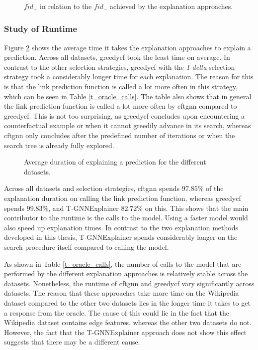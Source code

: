 \begin{figure}[ht]
    \centering
    
    \caption{$fid_+$ in relation to the $fid_-$ achieved by the explanation approaches.}
    \label{f_fid_plus_minus}
\end{figure}


\FloatBarrier
\subsubsection{Study of Runtime}
\label{s_Evaluation_Results_Runtime}

Figure \ref{f_duration} shows the average time it takes the explanation approaches to explain a prediction. Across all datasets, \gls{greedycf} took the least time on average. In contrast to the other selection strategies, \gls{greedycf} with the \textit{1-delta} selection strategy took a considerably longer time for each explanation. The reason for this is that the link prediction function is called a lot more often in this strategy, which can be seen in Table \ref{t_oracle_calls}. The table also shows that in general the link prediction function is called a lot more often by \gls{cftgnn} compared to \gls{greedycf}. This is not too surprising, as \gls{greedycf} concludes upon encountering a counterfactual example or when it cannot greedily advance in its search, whereas \gls{cftgnn} only concludes after the predefined number of iterations or when the search tree is already fully explored.

\begin{figure}
    \centering
    
    \caption{Average duration of explaining a prediction for the different datasets.}
    \label{f_duration}
\end{figure}


Across all datasets and selection strategies, \gls{cftgnn} spends $97.85\%$ of the explanation duration on calling the link prediction function, whereas \gls{greedycf} spends $99.83\%$, and T-GNNExplainer $82.72\%$ on this. This shows that the main contributor to the runtime is the calls to the model. Using a faster model would also speed up explanation times. In contrast to the two explanation methods developed in this thesis, T-GNNExplainer spends considerably longer on the search procedure itself compared to calling the model.

As shown in Table \ref{t_oracle_calls}, the number of calls to the model that are performed by the different explanation approaches is relatively stable across the datasets. Nonetheless, the runtime of \gls{cftgnn} and \gls{greedycf} vary significantly across datasets. The reason that these approaches take more time on the Wikipedia dataset compared to the other two datasets lies in the longer time it takes to get a response from the oracle. The cause of this could lie in the fact that the Wikipedia dataset contains edge features, whereas the other two datasets do not. However, the fact that the T-GNNExplainer approach does not show this effect suggests that there may be a different cause.

